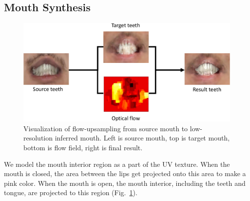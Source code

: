 
\subsection{Mouth Synthesis}

\begin{figure}[h]
	\centering
	\includegraphics[width=1\linewidth]{figures/flow/opticalflow.pdf}
	\caption{Visualization of flow-upsampling from source mouth to low-resolution inferred mouth.  Left is source mouth, top is target mouth, bottom is flow field, right is final result.}\label{fig:flow}
	\vspace{-0.05in}
\end{figure}
We model the mouth interior region as a part of the UV texture.  When the mouth is closed, the area between the lips get projected onto this area to
make a pink color.  When the mouth is open, the mouth interior, including the teeth and tongue, are projected to this region (Fig.~\ref{fig:flow}).  

